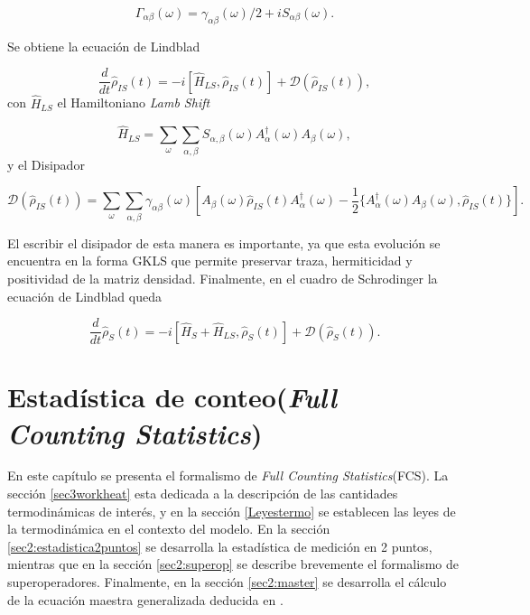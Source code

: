 \begin{equation*}
\Gamma_{\alpha \beta}(\omega) = \gamma_{\alpha \beta}(\omega)/2 + iS_{\alpha \beta}(\omega).
\end{equation*}

Se obtiene la ecuación de Lindblad 

\begin{equation}
    \frac{d}{dt} \hat{\rho}_{IS}(t) = -i[\hat{H}_{LS},\hat{\rho}_{IS}(t)] + \mathcal{D}(\hat{\rho}_{IS}(t)),
    \label{seclindbladfinal}
\end{equation}
con $\hat{H}_{LS}$ el Hamiltoniano \textit{Lamb Shift}

\begin{equation*}
    \hat{H}_{LS} = \sum_{\omega} \sum_{\alpha,\beta} S_{\alpha,\beta}(\omega)A^{\dagger}_{\alpha}(\omega)A_{\beta}(\omega), 
\end{equation*}
y el Disipador

\begin{equation*}
    \mathcal{D}(\hat{\rho}_{IS}(t)) = \sum_{\omega}\sum_{\alpha,\beta} \gamma_{\alpha \beta}(\omega) \left[ A_{\beta}(\omega)\hat{\rho}_{IS}(t)A^{\dagger}_{\alpha}(\omega) - \frac{1}{2}\{A^{\dagger}_{\alpha}(\omega)A_{\beta}(\omega), \hat{\rho}_{IS}(t)  \} \right].
\end{equation*}

El escribir el disipador de esta manera es importante, ya que esta evolución se encuentra en la forma GKLS que permite preservar traza, hermiticidad y positividad de la matriz densidad\cite{manzano2020short}. Finalmente, en el cuadro de Schrodinger la ecuación de Lindblad queda

\begin{equation*}
    \frac{d}{dt} \hat{\rho}_{S}(t) = -i[\hat{H}_{S}+\hat{H}_{LS},\hat{\rho}_{S}(t)] + \mathcal{D}(\hat{\rho}_{S}(t)).
\end{equation*}

\label{sec:lindblad}


\chapter{Estadística de conteo(\textit{Full Counting Statistics}) }
En este capítulo se presenta el formalismo de \textit{Full Counting Statistics}(FCS). La sección \ref{sec3workheat} esta dedicada a la  descripción de las cantidades termodinámicas de interés, y en la sección \ref{Leyestermo} se establecen las leyes de la termodinámica en el contexto del modelo. En la sección \ref{sec2:estadistica2puntos} se desarrolla la estadística de medición en 2 puntos, mientras que en la sección \ref{sec2:superop} se describe brevemente el formalismo de superoperadores. Finalmente, en la sección \ref{sec2:master} se desarrolla el cálculo de la ecuación maestra generalizada deducida en \cite{potts2021thermodynamically}. 

